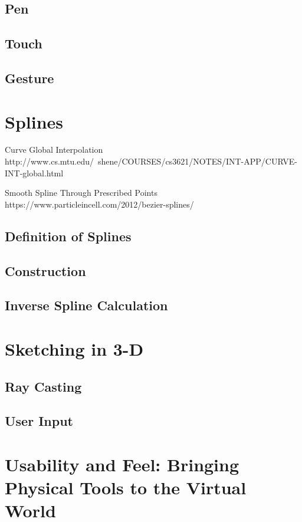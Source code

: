 \documentclass{article}
\begin{document}
\subsection{Pen}

\subsection{Touch}

\subsection{Gesture}

\section{Splines}

Curve Global Interpolation http://www.cs.mtu.edu/~shene/COURSES/cs3621/NOTES/INT-APP/CURVE-INT-global.html

Smooth Spline Through Prescribed Points https://www.particleincell.com/2012/bezier-splines/

\subsection{Definition of Splines}

\subsection{Construction}

\subsection{Inverse Spline Calculation}

\section{Sketching in 3-D}

\subsection{Ray Casting}

\subsection{User Input}

\section{Usability and Feel: Bringing Physical Tools to the Virtual World}
\end{document}
